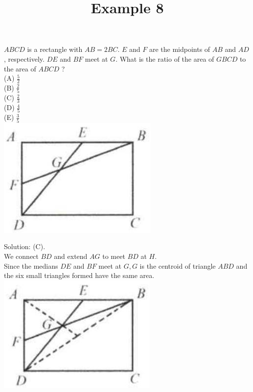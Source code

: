 \documentclass{article}
\title{Example 8}
\date{}
\begin{document}
\maketitle

\(A B C D\) is a rectangle with \(A B=2 B C\). \(E\) and \(F\) are the midpoints of \(A B\) and \(A D\), respectively. \(D E\) and \(B F\) meet at \(G\). What is the ratio of the area of \(G B C D\) to the area of \(A B C D\) ?\\
(A) \(\frac{5}{2}\)\\
(B) \(\frac{2}{5}\)\\
(C) \(\frac{2}{3}\)\\
(D) \(\frac{4}{5}\)\\
(E) \(\frac{3}{5}\)\\
\centering
\includegraphics[width=\textwidth]{images/problem_image_1.jpg}

Solution: (C).\\
We connect \(B D\) and extend \(A G\) to meet \(B D\) at \(H\).\\
Since the medians \(D E\) and \(B F\) meet at \(G, G\) is the centroid of triangle \(A B D\) and the six small triangles formed have the same area.\\
\centering
\includegraphics[width=\textwidth]{images/reasoning_image_1.jpg}
\end{document}
